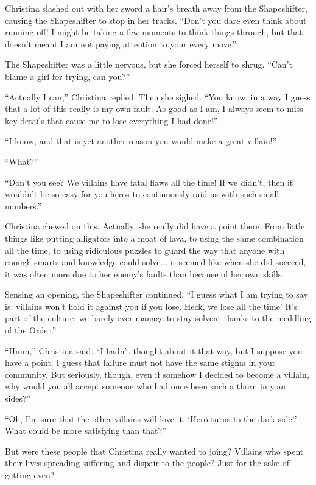 \documentclass[showtrims,b6paper,draft,10pt]{memoir}
\begin{document}
Christina slashed out with her sword a hair's breath away from the Shapeshifter, causing the Shapeshifter to stop in her tracks.  ``Don't you dare even think about running off!  I might be taking a few moments to think things through, but that doesn't meant I am not paying attention to your every move.''

The Shapeshifter was a little nervous, but she forced herself to shrug.  ``Can't blame a girl for trying, can you?''

``Actually I can,'' Christina replied.  Then she sighed.  ``You know, in a way I guess that a lot of this really is my own fault.  As good as I am, I always seem to miss key details that cause me to lose everything I had done!''

``I know, and that is yet another reason you would make a great villain!''

``What?''

``Don't you see?  We villains have fatal flaws all the time!  If we didn't, then it wouldn't be so easy for you heros to continuously raid us with such small numbers.''

Christina chewed on this.  Actually, she really did have a point there.  From little things like putting alligators into a moat of lava, to using the same combination all the time, to using ridiculous puzzles to guard the way that anyone with enough smarts and knowledge could solve... it seemed like when she did succeed, it was often more due to her enemy's faults than because of her own skills.

Sensing an opening, the Shapeshifter continued.  ``I guess what I am trying to say is:  villains won't hold it against you if you lose.  Heck, we lose all the time!  It's part of the culture;  we barely ever manage to stay solvent thanks to the meddling of the Order.''

``Hmm,'' Christina said.  ``I hadn't thought about it that way, but I suppose you have a point.  I guess that failure must not have the same stigma in your community.  But seriously, though, even if somehow I decided to become a villain, why would you all accept someone who had once been such a thorn in your sides?''

``Oh, I'm sure that the other villains will love it.  `Hero turns to the dark side!'  What could be more satisfying than that?''

But were these people that Christina really wanted to joing?  Villains who spent their lives spreading suffering and dispair to the people?  Just for the sake of getting even?
\end{document}
